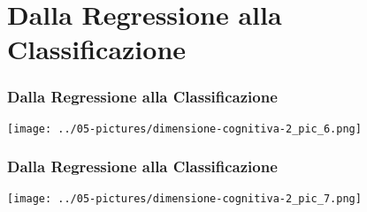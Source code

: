 \documentclass[aspectratio=169]{beamer}
\begin{document}
\section{Dalla Regressione alla Classificazione}
%
%
\begin{frame}
\frametitle{Dalla Regressione alla Classificazione}
\begin{center}
\texttt{[image: ../05-pictures/dimensione-cognitiva-2\_pic\_6.png]} 
\end{center}
\end{frame}
%
%
\begin{frame}
\frametitle{Dalla Regressione alla Classificazione}
\begin{center}
\texttt{[image: ../05-pictures/dimensione-cognitiva-2\_pic\_7.png]} 
\end{center}
\end{frame}
%
%
\end{document}
